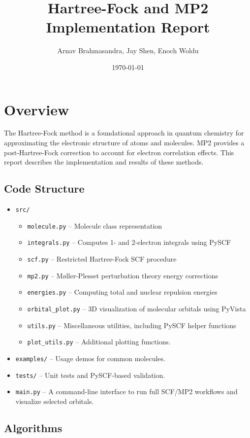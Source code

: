 \documentclass[12pt]{article}
\title{Hartree-Fock and MP2 Implementation Report}
\author{Arnav Brahmasandra, Jay Shen, Enoch Woldu}
\date{\today}
\begin{document}
\maketitle

\section{Overview}
The Hartree-Fock method is a foundational approach in quantum chemistry for approximating the electronic structure of atoms and molecules. MP2 provides a post-Hartree-Fock correction to account for electron correlation effects. This report describes the implementation and results of these methods.

\subsection{Code Structure}

\begin{itemize}
  \item \texttt{src/}
  \begin{itemize}
    \item \texttt{molecule.py} – Molecule class representation
    \item \texttt{integrals.py} – Computes 1- and 2-electron integrals using PySCF
    \item \texttt{scf.py} – Restricted Hartree-Fock SCF procedure
    \item \texttt{mp2.py} – Møller-Plesset perturbation theory energy corrections
    \item \texttt{energies.py} – Computing total and nuclear repulsion energies
    \item \texttt{orbital\_plot.py} – 3D visualization of molecular orbitals using PyVista
    \item \texttt{utils.py} – Miscellaneous utilities, including PySCF helper functions
    \item \texttt{plot\_utils.py} – Additional plotting functions.
  \end{itemize}
  \item \texttt{examples/} – Usage demos for common molecules.
  \item \texttt{tests/} – Unit tests and PySCF-based validation.
  \item \texttt{main.py} – A command-line interface to run full SCF/MP2 workflows and visualize selected orbitals.
\end{itemize}

\subsection{Algorithms}
\end{document}
